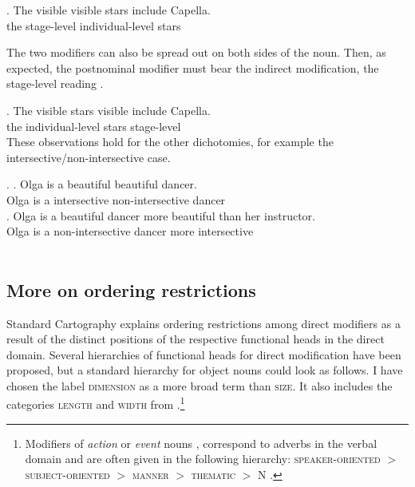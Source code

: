 \exg. The visible visible stars include Capella. \hfill \citep[155]{larson:1998:events}\\
the stage-level individual-level stars\\ \label{visiblevisible}

The two modifiers can also be spread out on both sides of the noun. Then, as expected, the postnominal modifier must bear the indirect modification, the stage-level reading \citep[19–20]{cinque:2010:adj}.

\exg. The visible stars visible include Capella. \null\hfill \citep[155]{larson:1998:events}\\
the individual-level stars stage-level\\

These observations hold for the other dichotomies, for example the intersective/non-intersective case. 

\largerpage[1]

\ex. \ag. Olga is a beautiful beautiful dancer.\\
Olga is a intersective non-intersective dancer\\
\null \hfill \citep[281]{larson:2004:indefinite}
\bg. Olga is a beautiful dancer more {beautiful than her instructor.}\hspace{-5mm}\\
Olga is a non-intersective dancer more intersective\\
~\hfill\citep[19]{cinque:2010:adj}

\subsection{More on ordering restrictions} \label{AORs}

Standard Cartography explains ordering restrictions among direct modifiers as a result of the distinct positions of the respective functional heads in the direct domain. Several hierarchies of functional heads for direct modification have been proposed, but a standard hierarchy for object nouns could look as follows. I have chosen the label \textsc{dimension} as a more broad term than \textsc{size}. It also includes the categories \textsc{length} and \textsc{width} from \citet[114]{scott:2002:stacked}.\footnote{Modifiers of \textit{action} or \textit{event} nouns \citep{grimshaw:1991:argument}, correspond to adverbs in the verbal domain \citep{cinque:1993:evidence, cinque:1999:adverbs, alexiadou:1997:adverb} and are often given in the following hierarchy: \textsc{speaker-oriented} $>$ \textsc{subject-oriented} $>$ \textsc{manner} $>$ \textsc{thematic} $>$ N \citep[324]{alex:2007:nounphrase}.}

